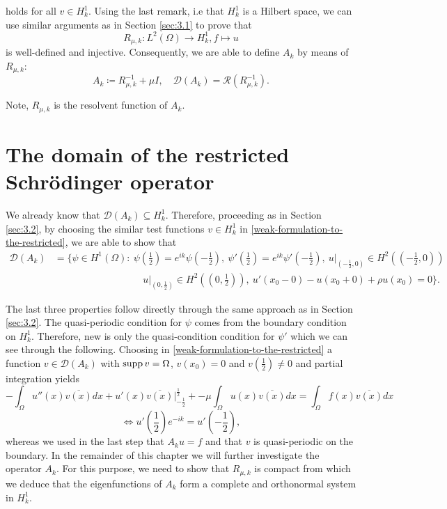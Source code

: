 holds for all $v \in H^{1}_{k}$. Using the last remark, i.e that $H^{1}_{k}$ is a Hilbert space, we can use similar arguments as in Section \ref{sec:3.1} to prove that 
	\[ R_{\mu, k} \colon L^{2}(\Omega) \rightarrow H^{1}_{k},  f \mapsto u \]
is well-defined and injective. Consequently, we are able to define $A_{k}$ by means of $R_{\mu, k}$:
	\[ A_{k} \coloneqq R_{\mu, k}^{-1} + \mu I, \quad \mathcal{D}(A_{k}) = \mathcal{R}(R_{\mu, k}^{-1}). \] 
	
\begin{remark}
	Note, $R_{\mu, k}$ is the resolvent function of $A_{k}$.
\end{remark}

\section{The domain of the restricted Schrödinger operator} \label{sec:4.1}

We already know that $\mathcal{D}(A_{k}) \subseteq H^{1}_{k}$. Therefore, proceeding as in Section \ref{sec:3.2}, by choosing the similar test functions $v \in H^{1}_{k}$ in \eqref{weak-formulation-to-the-restricted}, we are able to show that
\begin{align*}
	\mathcal{D}(A_{k}) & = \Big\{ \psi \in H^{1}(\Omega) \colon ~\psi\left(\frac{1}{2}\right) = e^{ik} \psi\left(-\frac{1}{2}\right), ~ \psi'\left(\frac{1}{2}\right) = e^{ik} \psi'\left(-\frac{1}{2}\right), ~ u\big|_{\left(-\frac{1}{2}, 0\right)} \in H^{2}\left(\left(-\frac{1}{2}, 0\right)\right) \\	
	 & ~\qquad ~\qquad ~\qquad ~\qquad ~ u\big|_{\left(0, \frac{1}{2}\right)} \in H^{2}\left(\left(0, \frac{1}{2}\right)\right), ~ u'(x_{0}-0) - u(x_{0} + 0) + \rho u(x_{0}) = 0 \Big\}. 
\end{align*}

The last three properties follow directly through the same approach as in Section \ref{sec:3.2}. The quasi-periodic condition for $\psi$ comes from the boundary condition on $H^{1}_{k}$. Therefore, new is only the quasi-condition condition for $\psi'$ which we can see through the following. Choosing in \eqref{weak-formulation-to-the-restricted} a function $v \in \mathcal{D}(A_{k})$ with $\operatorname{supp} v = \Omega$, $v\left(x_{0}\right) = 0$ and $v\left(\frac{1}{2}\right) \neq 0$ and partial integration yields
\[ - \int_{\Omega} u''(x) \overline{v(x)} dx +  u'(x) \overline{v(x)} \big|_{-\frac{1}{2}}^{\frac{1}{2}} + - \mu \int_{\Omega} u(x) \overline{v(x)} dx = \int_{\Omega} f(x) \overline{v(x)} dx \] 
\[ \iff u'\left(\frac{1}{2}\right) e^{-ik} = u'\left(-\frac{1}{2}\right), \] 
whereas we used in the last step that $A_{k} u = f$ and that $v$ is quasi-periodic on the boundary. In the remainder of this chapter we will further investigate the operator $A_{k}$. For this purpose, we need to show that $R_{\mu, k}$ is compact from which we deduce that the eigenfunctions of $A_{k}$ form a complete and orthonormal system in $H^{1}_{k}$.

